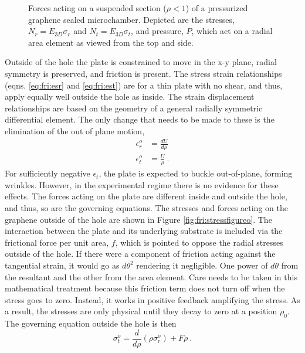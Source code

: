 \begin{figure}
	\begin{center}
	
	\end{center}
	\caption[Forces acting on suspended, pressurized graphene]{\label{fig:fri:stressfigurei}
	Forces acting on a suspended section ($\rho<1$) of a pressurized graphene sealed microchamber.
	Depicted are the stresses, $N_r=E_{3D} \sigma_r$ and $N_t=E_{3D} \sigma_t$, and pressure, $P$, which act on a radial area element as viewed from the top and side.
	}
\end{figure}

Outside of the hole the plate is constrained to move in the x-y plane, radial symmetry is preserved, and friction is present. 
The stress strain relationships (eqns. \ref{eq:fri:esr} and \ref{eq:fri:est}) are for a thin plate with no shear, and thus, apply equally well outside the hole as inside.
The strain displacement relationships are based on the geometry of a general radially symmetric differential element.
The only change that needs to be made to these is the elimination of the out of plane motion, 
\begin{align}
	\epsilon_r^o&=\frac{dU}{d\rho} \label{eq:fri:edro}\\
	\epsilon_t^o&=\frac{U}{\rho} \label{eq:fri:edto} \ .
\end{align}
For sufficiently negative $\epsilon_t$, the plate is expected to buckle out-of-plane, forming wrinkles.
However, in the experimental regime there is no evidence for these effects.
The forces acting on the plate are different inside and outside the hole, and thus, so are the governing equations.
The stresses and forces acting on the graphene outside of the hole are shown in Figure \ref{fig:fri:stressfigureo}.
The interaction between the plate and its underlying substrate is included via the frictional force per unit area, $f$, which is pointed to oppose the radial stresses outside of the hole.
If there were a component of friction acting against the tangential strain, it would go as $d \theta^2$ rendering it negligible.
One power of $d \theta$ from the resultant and the other from the area element.
Care needs to be taken in this mathematical treatment because this friction term does not turn off when the stress goes to zero.
Instead, it works in positive feedback amplifying the stress. 
As a result, the stresses are only physical until they decay to zero at a position $\rho_0$.
The governing equation outside the hole is then
\begin{equation}
	\sigma_t^o=\frac{d}{d\rho}(\rho \sigma_r^o)+F \rho  \ .
	\label{eq:fri:g1o}
\end{equation}
